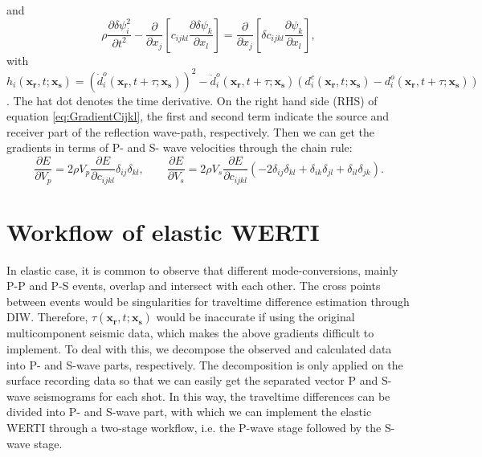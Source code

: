 and
\begin{equation}
    \rho \frac{\partial \delta \psi^2_i}{\partial t^2}  -
    \frac{\partial}{\partial x_j}\left[ 
        c_{ijkl}\frac{\partial \delta \psi_{k}}{\partial
        x_l}\right]=\frac{\partial}{\partial x_j}\left[\delta c_{ijkl}\frac{\partial
		\psi_{k}}{\partial x_l}\right],
    \label{eq:AdjointDeltaWE} 
\end{equation}
with
$h_i(\mathbf{x_r},t;\mathbf{x_s})=(\dot{d}^o_i(\mathbf{x_r},t+\tau;\mathbf{x_s}))^2-\ddot{d}^o_i(\mathbf{x_r},t+\tau;\mathbf{x_s})(d^c_i(\mathbf{x_r},t;\mathbf{x_s})-d^o_i(\mathbf{x_r},t+\tau;\mathbf{x_s}))$. The
hat dot denotes the time derivative. On the right hand side (RHS) of equation
\eqref{eq:GradientCijkl}, the first and second term indicate the source and receiver
part of the reflection wave-path, respectively. Then we can get the gradients in terms of P- and
S- wave velocities through the chain rule:
\begin{equation}
	\frac{\partial E}{\partial V_p}=2\rho V_p\frac{\partial E}{\partial
		c_{ijkl}}\delta_{ij}\delta_{kl}, \qquad
	\frac{\partial E}{\partial V_s}=2\rho V_s\frac{\partial
	E}{\partial c_{ijkl}}(-2\delta_{ij}\delta_{kl}+\delta_{ik}\delta_{jl}+
	\delta_{il}\delta_{jk}).
    \label{eq:GradientVel}
\end{equation}

\section{Workflow of elastic WERTI}
In elastic case, it is common to observe that different mode-conversions, mainly P-P
and P-S events, overlap and intersect with each other. The cross points between events
would be singularities for traveltime difference estimation through DIW.
Therefore, $\tau(\mathbf{x_r},t;\mathbf{x_s})$ would be inaccurate if using the
original multicomponent seismic data, which makes the above gradients difficult to implement.
To deal with this, we decompose the observed and calculated data into P- and S-wave
parts, respectively. The decomposition is only applied on the surface recording data
\cite[]{Li2016a}
so that we can easily get the separated vector P and S-wave seismograms for each shot.
In this way, the traveltime differences can be divided into P- and
S-wave part, with which we can implement the elastic WERTI through a two-stage
workflow, i.e. the P-wave stage followed by the S-wave stage.

